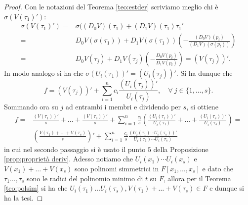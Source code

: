 \documentclass[10pt,oneside]{article}
\theoremstyle{definition}
\theoremstyle{plain}
\theoremstyle{definition}
\theoremstyle{plain}
\theoremstyle{plain}
\begin{document}
\begin{proof}
Con le notazioni del Teorema \ref{teo:estder}  scriviamo meglio chi è $\sigma( V(\tau_1)')$:
\[\begin{split}
\sigma(V(\tau_1)')=& \sigma( (D_0V)(\tau_1)+(D_1V)(\tau_1)\tau_1'\\
=&D_0V(\sigma(\tau_1)) + D_1V(\sigma(\tau_1))\left(-\frac{(D_0V)(p_t)}{(D_1V)(\sigma(p_t))}\right) \\
=&D_0V(\tau_j) + D_1V(\tau_j)\left(- \frac{D_0V (p_t)}{D_1V (p_t)} \right) = (V(\tau_j))'.
\end{split}
\]
In modo analogo si ha che $\sigma(U_i(\tau_1))'=(U_i(\tau_j))'$. Si ha dunque che 
\[ f = (V(\tau_j))'+\sum_{i=1}^n c_i \frac{(U_i(\tau_j))'}{U_i(\tau_j)}, \quad \forall \ j \in \{1,\dots, s  \}.\]
Sommando ora su $j$ ad entrambi i membri e dividendo per $s$, si ottiene
\[ \begin{split}
f=&\frac{(V(\tau_1))'}{s} + \dots + \frac{(V(\tau_s))'}{s} + \sum_{i=1}^n \frac{c_i}{s} \left(\frac{(U_i(\tau_1))'}{U_i(\tau_1)}+\dots+\frac{(U_i(\tau_s))'}{U_i(\tau_s)} \right)=\\
& \left(\frac{V(\tau_1)+\dots+V(\tau_s)}{s}\right)' + \sum_{i=1}^n \frac{c_i}{s} \frac{(U_i(\tau_1)\cdots U_i(\tau_s))'}{U_i(\tau_1)\cdots U_i(\tau_s)}
\end{split}
\]
in cui nel secondo passaggio si è usato il punto $5$ della Proposizione
 \ref{prop:proprietà deriv}. Adesso notiamo che $U_i(x_1)\cdots U_i(x_s)$ e $V(x_1)+\dots + V(x_s)$ sono polinomi simmetrici in $F[x_1,\dots,x_s]$ e dato che $\tau_1\dots , \tau_s$ sono le radici del polinomio minimo di $t$ su $F$, allora per il Teorema \ref{teo:polsim} si ha che $U_i(\tau_1)\dots U_i(\tau_s), V(\tau_1)+\dots + V(\tau_s) \in F$ e dunque si ha la tesi.
 


\end{proof}
\end{document}
